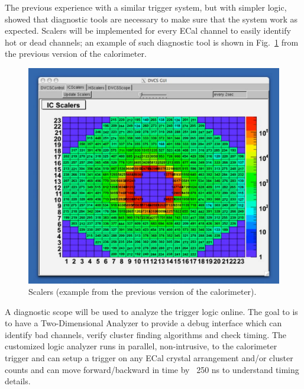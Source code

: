 
The previous experience with a similar trigger system, but with simpler logic, showed that diagnostic tools are necessary to make sure that the system work as expected. Scalers will be implemented for every ECal channel to easily identify hot or dead channels; an example of such diagnostic tool is shown in Fig.~\ref{fig:dvcs_beam} 
from the previous version of the calorimeter. 
\begin{figure}[h]
\includegraphics[scale=0.6]{daq_trigger/figures/dvcs_beam}
\caption{\small{Scalers (example from the previous version of the calorimeter).}}
\label{fig:dvcs_beam}
\end{figure}
A diagnostic scope will be used to analyze the trigger logic online. The goal to is to have a Two-Dimensional Analyzer 
to provide a debug interface which can identify bad channels, verify cluster finding algorithms and check timing. The customized logic analyzer runs in parallel, non-intrusive, to the calorimeter trigger and can setup a trigger 
on any ECal crystal arrangement and/or cluster counts and can move forward/backward in time by ~250 ns to understand timing details.
